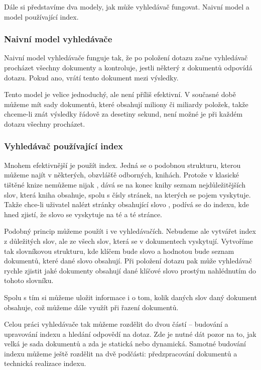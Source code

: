 \documentclass[12pt]{article}
\begin{document}
Dále si představíme dva modely, jak může vyhledávač fungovat. Naivní model a model používající index.

\subsubsection{Naivní model vyhledávače}

Naivní model vyhledávače funguje tak, že po položení dotazu začne vyhledávač procházet všechny dokumenty a kontroluje, jestli některý z dokumentů odpovídá dotazu. Pokud ano, vrátí tento dokument mezi výsledky. 

Tento model je velice jednoduchý, ale není příliš efektivní. V současné době můžeme mít sady dokumentů, které obsahují miliony či miliardy položek, takže chceme-li znát výsledky řádově za desetiny sekund, není možné je při každém dotazu všechny procházet.

\subsubsection{Vyhledávač používající index}
Mnohem efektivnější je použít index. Jedná se o podobnou strukturu, kterou můžeme najít v některých, obzvlášťě odborných, knihách. Protože v klasické tištěné knize nemůžeme nijak , dává se na konec knihy seznam nejdůležitějších slov, která kniha obsahuje, spolu s čísly stránek, na kterých se pojem vyskytuje. Takže chce-li uživatel nalézt stránky obsahující slovo , podívá se do indexu, kde hned zjistí, že slovo se vyskytuje na té a té stránce. 

Podobný princip můžeme použít i ve vyhledávačích. Nebudeme ale vytvářet index z důležitých slov, ale ze všech slov, která se v dokumentech vyskytují. Vytvoříme tak slovníkovou strukturu, kde klíčem bude slovo a hodnotou bude seznam dokumentů, které dané slovo obsahují. Při položení dotazu pak může vyhledávač rychle zjistit jaké dokumenty obsahují dané klíčové slovo prostým nahlédnutím do tohoto slovníku. 

Spolu s tím si můžeme uložit informace i o tom, kolik daných slov daný dokument obsahuje, což můžeme dále využít při řazení dokumentů. 

Celou práci vyhledávače tak můžeme rozdělit do dvou částí -- budování a upravování indexu a hledání odpovědí na dotaz. Zde je nutné dát pozor na to, jak velká je sada dokumentů a zda je statická nebo dynamická. Samotné budování indexu můžeme ještě rozdělit na dvě podčásti: předzpracování dokumentů a technická realizace indexu. 
\end{document}
